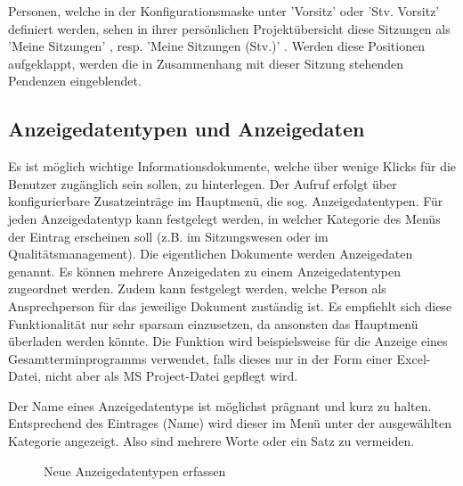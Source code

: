 Personen, welche in der Konfigurationsmaske unter 'Vorsitz' oder 'Stv. Vorsitz' definiert werden, sehen in ihrer persönlichen Projektübersicht diese Sitzungen als 'Meine Sitzungen' , resp. 'Meine Sitzungen (Stv.)' . Werden diese Positionen aufgeklappt, werden die in Zusammenhang mit dieser Sitzung stehenden Pendenzen eingeblendet. 

\subsection{Anzeigedatentypen und Anzeigedaten}

Es ist möglich wichtige Informationsdokumente, welche über wenige Klicks für die Benutzer zugänglich sein sollen, zu hinterlegen. Der Aufruf erfolgt über konfigurierbare Zusatzeinträge im Hauptmenü, die sog. Anzeigedatentypen. Für jeden Anzeigedatentyp kann festgelegt werden, in welcher Kategorie des Menüs der Eintrag erscheinen soll (z.B. im Sitzungswesen oder im Qualitätsmanagement). Die eigentlichen Dokumente werden Anzeigedaten genannt. Es können mehrere Anzeigedaten zu einem Anzeigedatentypen zugeordnet werden. Zudem kann festgelegt werden, welche Person als Ansprechperson für das jeweilige Dokument zuständig ist. Es empfiehlt sich diese Funktionalität nur sehr sparsam einzusetzen, da ansonsten das Hauptmenü überladen werden könnte. Die Funktion wird beispielsweise für die Anzeige eines Gesamtterminprogramms verwendet, falls dieses nur in der Form einer Excel-Datei, nicht aber als MS Project-Datei gepflegt wird.

\vspace{\baselineskip}

Der Name eines Anzeigedatentyps ist möglichst prägnant und kurz zu halten. Entsprechend des Eintrages (Name) wird dieser im Menü unter der ausgewählten Kategorie angezeigt. Also sind mehrere Worte oder ein Satz zu vermeiden.

\begin{figure}[H]
\caption{Neue Anzeigedatentypen erfassen}
\end{figure}


